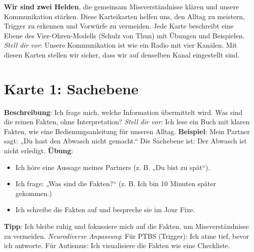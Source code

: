 \documentclass[a4paper,10pt]{article}
\begin{document}
\begin{tcolorbox}[colback=calmgrey, colframe=calmblue, title={\textbf{Vier-Ohren-Modell: Karteikarten für unser Superteam}}, breakable]
\textbf{Wir sind zwei Helden}, die gemeinsam Missverständnisse klären und unsere Kommunikation stärken. Diese Karteikarten helfen uns, den Alltag zu meistern, Trigger zu erkennen und Vorwürfe zu vermeiden. Jede Karte beschreibt eine Ebene des Vier-Ohren-Modells (Schulz von Thun) mit Übungen und Beispielen. \newline
\textit{Stell dir vor}: Unsere Kommunikation ist wie ein Radio mit vier Kanälen. Mit diesen Karten stellen wir sicher, dass wir auf denselben Kanal eingestellt sind.
\end{tcolorbox}

\section*{Karte 1: Sachebene}
\begin{tcolorbox}[colback=calmgrey, colframe=calmblue, title={\textbf{Sachebene: Was sind die Fakten?}}]
\textbf{Beschreibung}: Ich frage mich, welche Information übermittelt wird. Was sind die reinen Fakten, ohne Interpretation? \newline
\textit{Stell dir vor}: Ich lese ein Buch mit klaren Fakten, wie eine Bedienungsanleitung für unseren Alltag. \newline
\textbf{Beispiel}: Mein Partner sagt: „Du hast den Abwasch nicht gemacht.“ Die Sachebene ist: Der Abwasch ist nicht erledigt. \newline
\textbf{Übung}: 
\begin{itemize}[leftmargin=*]
    \item Ich höre eine Aussage meines Partners (z. B. „Du bist zu spät“).
    \item Ich frage: „Was sind die Fakten?“ (z. B. Ich bin 10 Minuten später gekommen.)
    \item Ich schreibe die Fakten auf und bespreche sie im Jour Fixe.
\end{itemize}
\textbf{Tipp}: Ich bleibe ruhig und fokussiere mich auf die Fakten, um Missverständnisse zu vermeiden. \newline
\textit{Neurodiverse Anpassung}: Für PTBS (Trigger): Ich atme tief, bevor ich antworte. Für Autismus: Ich visualisiere die Fakten wie eine Checkliste.
\end{tcolorbox}
\end{document}
